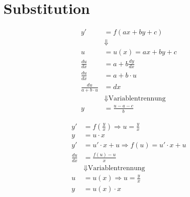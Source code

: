 \section{Substitution}

\begin{center}
\begin{align*}
y' &= f(ax+by+c) \\
&\Downarrow \\
u &= u(x) = ax +by +c\\
\frac{du}{dx} &= a + b\frac{dy}{dx}\\
\frac{du}{dx} &= a +b\cdot u\\
\frac{du}{a+b\cdot u} &= dx\\
&\Downarrow \text{Variablentrennung}\\
y &= \frac{u-a-c}{b}
\end{align*}
\end{center}

\begin{center}
\begin{align*}
y' &= f\left(\frac{y}{x}\right)\Rightarrow u =\frac{y}{x}\\
y &= u\cdot x\\
y' &= u'\cdot x + u \Rightarrow f(u) = u'\cdot x +u\\
\frac{du}{dx} &= \frac{f(u)-u}{x}\\
&\Downarrow \text{Variablentrennung}\\
u &= u(x) \Rightarrow u = \frac{y}{x}\\
y &= u(x)\cdot x
\end{align*}
\end{center}
